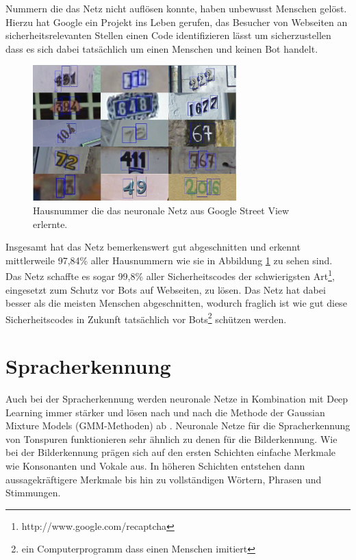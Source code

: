 Nummern die das Netz nicht auflösen konnte, haben unbewusst Menschen gelöst. Hierzu hat Google ein Projekt ins Leben gerufen, das Besucher von Webseiten an sicherheitsrelevanten Stellen einen Code identifizieren lässt um sicherzustellen dass es sich dabei tatsächlich um einen Menschen und keinen Bot handelt.

\begin{figure}
	\centering
	\includegraphics[width=0.7\textwidth]{images/streetview-numbers.png}
	\caption{Hausnummer die das neuronale Netz aus Google Street View erlernte.}
	\label{fig:streetview-numbers}
\end{figure}

Insgesamt hat das Netz bemerkenswert gut abgeschnitten \citep{numbercharts} und erkennt mittlerweile 97,84\% aller Hausnummern wie sie in Abbildung \ref{fig:streetview-numbers} zu sehen sind. Das Netz schaffte es sogar 99,8\% aller Sicherheitscodes der schwierigsten Art\footnote{http://www.google.com/recaptcha}, eingesetzt zum Schutz vor Bots auf Webseiten, zu lösen. Das Netz hat dabei besser als die meisten Menschen abgeschnitten, wodurch fraglich ist wie gut diese Sicherheitscodes in Zukunft tatsächlich vor Bots\footnote{ein Computerprogramm dass einen Menschen imitiert} schützen werden.

\section{Spracherkennung}

Auch bei der Spracherkennung werden neuronale Netze in Kombination mit Deep Learning immer stärker und lösen nach und nach die Methode der Gaussian Mixture Models (GMM-Methoden) ab \citep{GaussVsNeural}. Neuronale Netze für die Spracherkennung von Tonspuren funktionieren sehr ähnlich zu denen für die Bilderkennung. Wie bei der Bilderkennung prägen sich auf den ersten Schichten einfache Merkmale wie Konsonanten und Vokale aus. In höheren Schichten entstehen dann aussagekräftigere Merkmale bis hin zu vollständigen Wörtern, Phrasen und Stimmungen. 

